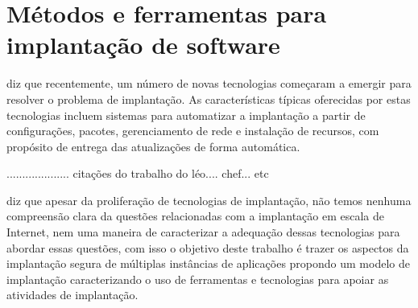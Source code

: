 \section{Métodos e ferramentas para implantação de software}


\cite{deployment1998} diz que recentemente, um número de novas tecnologias
começaram a emergir para resolver o problema de implantação. As características
típicas oferecidas por estas tecnologias incluem sistemas para automatizar a
implantação a partir de configurações, pacotes, gerenciamento de rede
e instalação de recursos, com  propósito de entrega das atualizações de forma
automática.


.................... citações do trabalho do léo.... chef... etc

\cite{deployment1998} diz que  apesar da proliferação de tecnologias de
implantação, não temos nenhuma compreensão clara da questões relacionadas com a
implantação em escala de Internet, nem uma maneira de caracterizar a adequação
dessas tecnologias para abordar essas questões, com isso o objetivo deste trabalho
é trazer os aspectos da implantação segura de múltiplas instâncias de aplicações
propondo um modelo de implantação caracterizando o uso de ferramentas e tecnologias
para apoiar as atividades de implantação.

%

